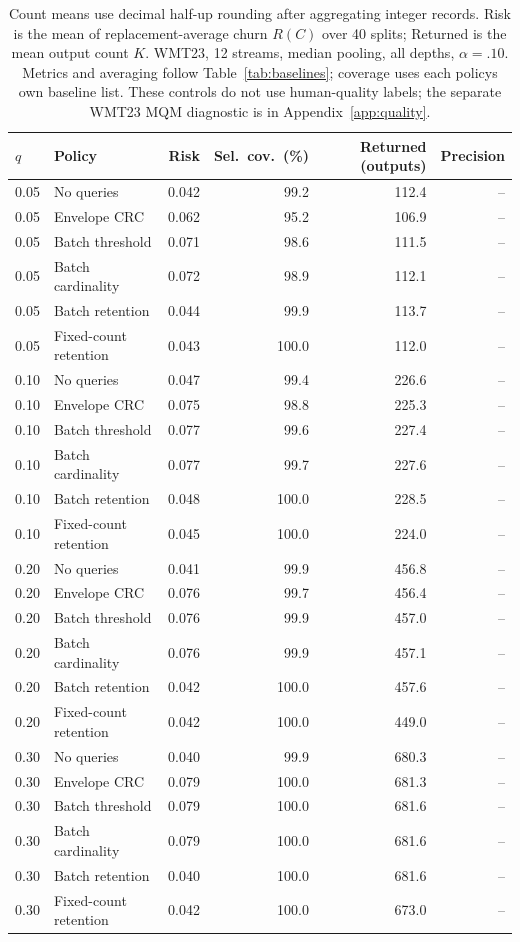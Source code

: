 \begin{table}[t]
\centering\small
\begin{tabular}{llrrrr}
\toprule
$q$ & Policy & Risk & Sel.\ cov.\ (\%) & Returned (outputs) & Precision \\
\midrule
0.05 & No queries & 0.042 & 99.2 & 112.4 & -- \\
0.05 & Envelope CRC & 0.062 & 95.2 & 106.9 & -- \\
0.05 & Batch threshold & 0.071 & 98.6 & 111.5 & -- \\
0.05 & Batch cardinality & 0.072 & 98.9 & 112.1 & -- \\
0.05 & Batch retention & 0.044 & 99.9 & 113.7 & -- \\
0.05 & Fixed-count retention & 0.043 & 100.0 & 112.0 & -- \\
0.10 & No queries & 0.047 & 99.4 & 226.6 & -- \\
0.10 & Envelope CRC & 0.075 & 98.8 & 225.3 & -- \\
0.10 & Batch threshold & 0.077 & 99.6 & 227.4 & -- \\
0.10 & Batch cardinality & 0.077 & 99.7 & 227.6 & -- \\
0.10 & Batch retention & 0.048 & 100.0 & 228.5 & -- \\
0.10 & Fixed-count retention & 0.045 & 100.0 & 224.0 & -- \\
0.20 & No queries & 0.041 & 99.9 & 456.8 & -- \\
0.20 & Envelope CRC & 0.076 & 99.7 & 456.4 & -- \\
0.20 & Batch threshold & 0.076 & 99.9 & 457.0 & -- \\
0.20 & Batch cardinality & 0.076 & 99.9 & 457.1 & -- \\
0.20 & Batch retention & 0.042 & 100.0 & 457.6 & -- \\
0.20 & Fixed-count retention & 0.042 & 100.0 & 449.0 & -- \\
0.30 & No queries & 0.040 & 99.9 & 680.3 & -- \\
0.30 & Envelope CRC & 0.079 & 100.0 & 681.3 & -- \\
0.30 & Batch threshold & 0.079 & 100.0 & 681.6 & -- \\
0.30 & Batch cardinality & 0.079 & 100.0 & 681.6 & -- \\
0.30 & Batch retention & 0.040 & 100.0 & 681.6 & -- \\
0.30 & Fixed-count retention & 0.042 & 100.0 & 673.0 & -- \\
\bottomrule
\end{tabular}
\caption{Count means use decimal half-up rounding after aggregating integer records. Risk is the mean of replacement-average churn $R(C)$ over 40 splits; Returned is the mean output count $K$. WMT23, 12 streams, median pooling, all depths, $\alpha=.10$. Metrics and averaging follow Table~\ref{tab:baselines}; coverage uses each policy\textquotesingle s own baseline list. These controls do not use human-quality labels; the separate WMT23 MQM diagnostic is in Appendix~\ref{app:quality}.}
\label{tab:baseline-2-median}
\end{table}
